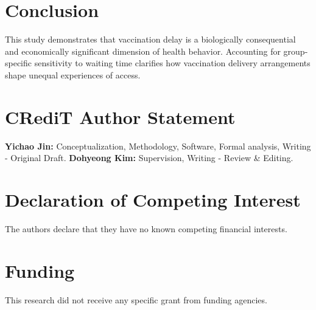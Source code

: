 \documentclass[preprint,12pt,authoryear]{elsarticle}
\begin{document}
\section{Conclusion}
This study demonstrates that vaccination delay is a biologically consequential and economically significant dimension of health behavior. Accounting for group-specific sensitivity to waiting time clarifies how vaccination delivery arrangements shape unequal experiences of access.

\section*{CRediT Author Statement}
\textbf{Yichao Jin:} Conceptualization, Methodology, Software, Formal analysis, Writing - Original Draft. \textbf{Dohyeong Kim:} Supervision, Writing - Review \& Editing.

\section*{Declaration of Competing Interest}
The authors declare that they have no known competing financial interests.

\section*{Funding}
This research did not receive any specific grant from funding agencies.



\end{document}
